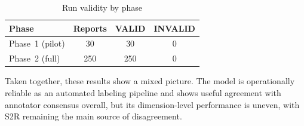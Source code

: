 \begin{table}[t]
\caption{Run validity by phase}
\label{tab:run_validity}
\centering
\begin{tabular}{lccc}
\hline
\textbf{Phase} & \textbf{Reports} & \textbf{VALID} & \textbf{INVALID} \\
\hline
Phase~1 (pilot)   & 30  & 30  & 0 \\
Phase~2 (full)    & 250 & 250 & 0 \\
\hline
\end{tabular}
\end{table}

Taken together, these results show a mixed picture. The model is
operationally reliable as an automated labeling pipeline and shows
useful agreement with annotator consensus overall, but its
dimension-level performance is uneven, with S2R remaining the main
source of disagreement.
